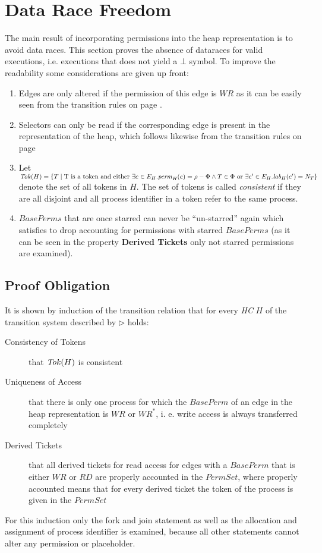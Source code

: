 \section{Data Race Freedom}
	The main result of incorporating permissions into the heap representation
	is to avoid data races. This section proves the absence of dataraces for
	valid executions, i.e. executions that does not yield a $\bot$ symbol.
	To improve the readability some considerations are given up front:
	\begin{enumerate}
		\item Edges are only altered if the permission of this edge is
			$\mathit{WR}$ as it can be easily seen from the transition rules on
			page \pageref{transitionrules}.
		\item Selectors can only be read if the corresponding edge is present in
			the representation of the heap, which follows likewise from the
			transition rules on page \pageref{transitionrules}
		\item Let $\mathit{Tok}(H) = \{ T \mid \text{T is a token and either }\exists
				e\in E_{H}.\mathit{perm}_{H}(e)=\rho-\Phi \land T\in\Phi
			\text{ or }\exists e'\in E_{H}.\mathit{lab}_{H}(e')=N_{T}\}$ denote the set
			of all tokens in $H$. The set of tokens is called \emph{consistent}
			if they are all disjoint and all process identifier in a token refer
			to the same process.
		\item $\mathit{BasePerms}$ that are once starred can never be
			\enquote{un-starred} again which satisfies to drop accounting for
			permissions with starred $\mathit{BasePerms}$ (as it can be seen
			in the property \textbf{Derived Tickets} only not starred permissions
			are examined).
	\end{enumerate}
	\subsection{Proof Obligation}
	It is shown by induction of the transition relation that for every
	\emph{\ac{HC}} $H$ of the transition system described by $\rhd$ holds:
	\begin{description}
		\item[Consistency of Tokens] that $\mathit{Tok}(H)$ is consistent
		\item[Uniqueness of Access] that there is only one process for which the
			$\mathit{BasePerm}$ of an edge in the heap representation is
			$\mathit{WR}$ or $\mathit{WR}^{\ast}$, i. e. write access is always
			transferred completely
		\item[Derived Tickets] that all derived tickets for read access for edges
			with a $\mathit{BasePerm}$ that is either $\mathit{WR}$ or
			$\mathit{RD}$ are properly accounted in the $\mathit{PermSet}$, where
			properly accounted means that for every derived ticket the token of
			the process is given in the $\mathit{PermSet}$
	\end{description}
	For this induction only the fork and join statement as well as the
	allocation and assignment of process identifier is examined, because all
	other statements cannot alter any permission or placeholder.

